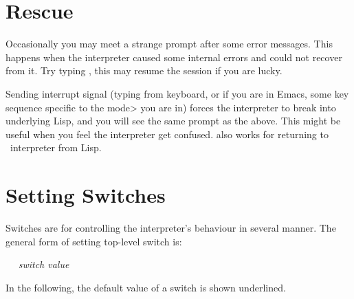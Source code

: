 \documentclass[a4paper,oneside,twocolumn]{memoir}
\begin{document}
\section{Rescue}

Occasionally you may meet a strange prompt  after some
error messages. This happens when the interpreter caused some internal
errors and could not recover from it. Try typing , this may
resume the session if you are lucky. 

Sending interrupt signal (typing  from keyboard, or if you
are in Emacs, some key sequence specific to the \<mode> you are in)
forces the interpreter to break into underlying Lisp, and you will see
the same prompt as the above. 
This might be useful when you feel the interpreter get confused.
 also works for returning to \cafeobj\ interpreter from Lisp.

\section{Setting Switches}

Switches are for controlling the interpreter's behaviour in several manner.
The general form of setting top-level switch is:

\ \  {\it switch value\/} 

In the following, the default value of a switch is shown
underlined.
\end{document}
